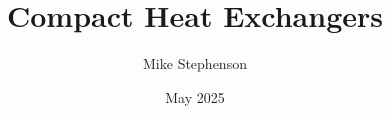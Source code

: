 \documentclass[a4paper,12pt]{book}
\begin{document}
\author{Mike Stephenson}
\title{Compact Heat Exchangers}
\date{May 2025}

\frontmatter
\maketitle
\tableofcontents

\mainmatter




\backmatter
\end{document}
